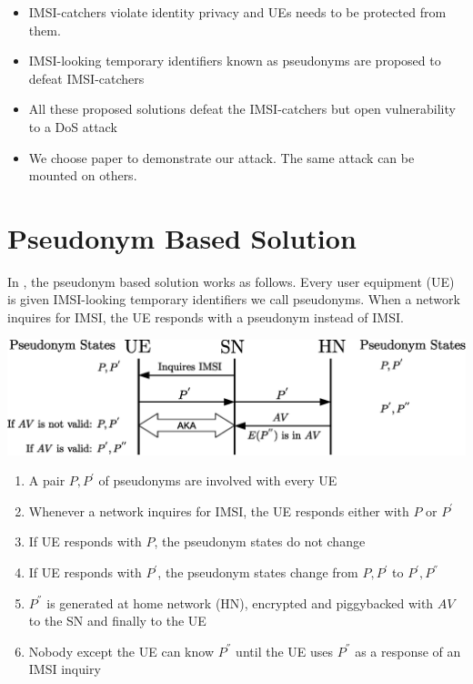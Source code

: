 \documentclass[portrait,a0]{a0poster}
\begin{document}
\begin{multicols}{2}
\begin{itemize}
\item IMSI-catchers violate identity privacy and UEs needs to be protected from them.
\item IMSI-looking temporary identifiers known as pseudonyms are proposed \citep{Ginzboorg_Niemi_2016,Norrman_Naslund_Dubrova_2016,CCS15,SSR15} to defeat IMSI-catchers
\item All these proposed solutions defeat the IMSI-catchers but open vulnerability to a DoS attack
\item We choose \citep{CCS15} paper to demonstrate our attack. The same attack can be mounted on others.
\end{itemize}


\section{Pseudonym Based Solution}
In \citep{CCS15}, the pseudonym based solution works as follows. Every user equipment (UE) is given IMSI-looking temporary identifiers we call pseudonyms. When a network inquires for IMSI, the UE responds with a pseudonym instead of IMSI.

\begin{center}
\begin{minipage}[t]{0.9\linewidth} %
\vspace{.5cm} %
\includegraphics[width=1\linewidth]{ccs_solution.eps}
\hspace{0pt}
\vspace{.5cm}
\end{minipage} 
\end{center}

\begin{enumerate}
\item A pair $P,P^{'}$ of pseudonyms are involved with every UE
\item Whenever a network inquires for IMSI, the UE responds either with $P$ or $P^{'}$
\item If UE responds with $P$, the pseudonym states do not change
\item \label{item:weakness} If UE responds with $P^{'}$, the pseudonym states change from $P,P^{'}$ to $P^{'},P^{''}$
\item $P^{''}$ is generated at home network (HN), encrypted and piggybacked with $AV$ to the SN and finally to the UE
\item Nobody except the UE can know $P^{''}$ until the UE uses $P^{''}$ as a response of an IMSI inquiry
\end{enumerate}


\end{multicols}
\end{document}
